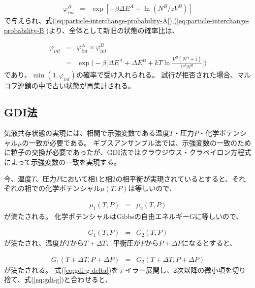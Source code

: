 \documentclass[titlepage]{jsreport}
\begin{document}
\large
\begin{eqnarray}
\varphi_{int}^B &=& \exp[-{\beta}{\Delta}E^A+\ln(N^B/zV^B)]\label{eq:particle-interchange-probability-B}
\end{eqnarray}
\normalsize
で与えられ、式(\ref{eq:particle-interchange-probability-A}),(\ref{eq:particle-interchange-probability-B})より、全体として新旧の状態の確率比は、

\large
\begin{eqnarray}
\varphi_{int} &=& \varphi_{int}^A×\varphi_{int}^B \nonumber\\
              &=& \exp\Bigg(-\beta\bigg[{\Delta}E^A+{\Delta}E^B+{kT}\ln{\frac{V^B(N^A+1)}{V^AN^B}}\bigg]\Bigg)\label{eq:particle-interchange-probability-all}
\end{eqnarray}
\normalsize
であり、$\min(1, \varphi_{int})$の確率で受け入れられる。
試行が拒否された場合、マルコフ連鎖の中で古い状態が再集計される。


\subsection{GDI法}\label{principle-subsec:gibbs-duhem-integration}
気液共存状態の実現には、相間で示強変数である温度$T$・圧力$P$・化学ポテンシャル$\mu$の一致が必要である。
ギブスアンサンブル法では、示強変数の一致のために粒子の交換が必要であったが、GDI法ではクラウジウス・クラペイロン方程式によって示強変数の一致を実現する。

今、温度$T$、圧力$P$において相1と相2の相平衡が実現されているとすると、それぞれの相での化学ポテンシャル$\mu(T,P)$は等しいので、

\large
\begin{eqnarray}
\mu_1(T,P) &=& \mu_2(T,P) \label{eq:gdi-mu}
\end{eqnarray}
\normalsize
が満たされる。
化学ポテンシャルはGibbsの自由エネルギー$G$に等しいので、

\large
\begin{eqnarray}
G_1(T,P) &=& G_2(T,P) \label{eq:gdi-g}
\end{eqnarray}
\normalsize
が満たされ、温度が$T$から$T+\Delta{T}$、平衡圧が$P$から$P+\Delta{P}$になるとすると、

\large
\begin{eqnarray}
G_1(T+\Delta{T},P+\Delta{P}) &=& G_2(T+\Delta{T},P+\Delta{P}) \label{eq:gdi-g-delta}
\end{eqnarray}
\normalsize
が満たされる。
式(\ref{eq:gdi-g-delta})をテイラー展開し、2次以降の微小項を切り捨て、式(\ref{eq:gdi-g})と合わせると、
\end{document}
